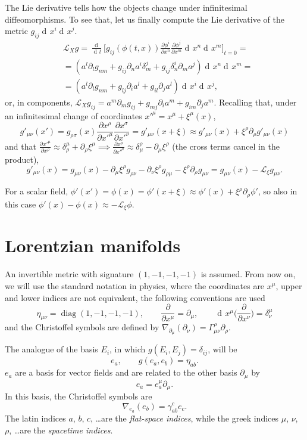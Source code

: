 \documentclass[a4paper,12pt]{book}
\newcommand{\dd}{\mathop{\mathrm{d}\!}{}}
\DeclareMathOperator\diag{diag}
\theoremstyle{definition}
\theoremstyle{remark}
\begin{document}
The Lie derivative tells how the objects change under infinitesimal diffeomorphisms. To see that, let us finally compute the Lie derivative of the metric $g_{ij}\dd x^i\dd x^j$.
\begin{align*}
&\mathcal L_Xg=\frac{\dd}{\dd t}\biggl[g_{ij}(\phi(t,x))\frac{\partial\phi^i}{\partial x^n}\frac{\partial\phi^j}{\partial x^m}\dd x^n\dd x^m\biggr]_{t=0}=\\
&=(a^l\partial_lg_{nm}+g_{ij}\partial_na^i\delta_m^j+g_{ij}\delta_n^i\partial_ma^j)\dd x^n\dd x^m=\\
&=(a^l\partial_lg_{nm}+g_{lj}\partial_ia^l+g_{il}\partial_ja^l)\dd x^i\dd x^j,
\end{align*}
or, in components, $\mathcal L_Xg_{ij}=a^m\partial_mg_{ij}+g_{mj}\partial_ia^m+g_{im}\partial_ja^m$. Recalling that, under an infinitesimal change of coordinates $x'^\mu=x^\mu+\xi^\mu(x)$,
\[g'_{\mu\nu}(x')=g_{\rho\sigma}(x)\frac{\partial x^\rho}{\partial x'^\mu}\frac{\partial x^\sigma}{\partial x'^\nu}=g'_{\mu\nu}(x+\xi)\approx g'_{\mu\nu}(x)+\xi^\rho\partial_\rho g'_{\mu\nu}(x)\]
and that $\frac{\partial x'^\mu}{\partial x^\rho}\approx\delta_\rho^\mu+\partial_\rho\xi^\mu\implies \frac{\partial x^\rho}{\partial x'^\mu}\approx\delta^\rho_\mu-\partial_\mu\xi^\rho$ (the cross terms cancel in the product),
\[g'_{\mu\nu}(x)=g_{\mu\nu}(x)-\partial_\mu\xi^\rho g_{\rho\nu}-\partial_\nu \xi^\rho g_{\rho\mu}-\xi^\rho\partial_\rho g_{\mu\nu}=g_{\mu\nu}(x)-\mathcal L_\xi g_{\mu\nu}.\]

For a scalar field, $\phi'(x')=\phi(x)=\phi'(x+\xi)\approx\phi'(x)+\xi^\rho\partial_\rho\phi'$, so also in this case $\phi'(x)-\phi(x)\approx-\mathcal L_\xi\phi$.

\section{Lorentzian manifolds}

An invertible metric with signature $(1,-1,-1,-1)$ is assumed. From now on, we will use the standard notation in physics, where the coordinates are $x^\mu$, upper and lower indices are not equivalent, the following conventions are used
\[\eta_{\mu\nu}=\diag(1,-1,-1,-1),\qquad \frac{\partial}{\partial x^\mu}=\partial_\mu,\qquad \dd x^\mu\biggl(\frac{\partial}{\partial x^\nu}\biggr)=\delta^\mu_\nu\]
and the Christoffel symbols are defined by $\nabla_{\partial_\mu}(\partial_\nu)=\Gamma_{\mu\nu}^\rho\partial_\rho$.

The analogue of the basis $E_i$, in which $g(E_i,E_j)=\delta_{ij}$, will be
\[e_a,\qquad g(e_a,e_b)=\eta_{ab}.\]
$e_a$ are a basis for vector fields and are related to the other basis $\partial_\mu$ by
\[e_a=e_a^\mu\partial_\mu.\]
In this basis, the Christoffel symbols are
\[\nabla_{e_a}(e_b)=\gamma_{ab}^ce_c.\]
The latin indices $a$, $b$, $c$, \ldots are the \emph{flat-space indices}, while the greek indices $\mu$, $\nu$, $\rho$, \ldots are the \emph{spacetime indices}.
\end{document}
